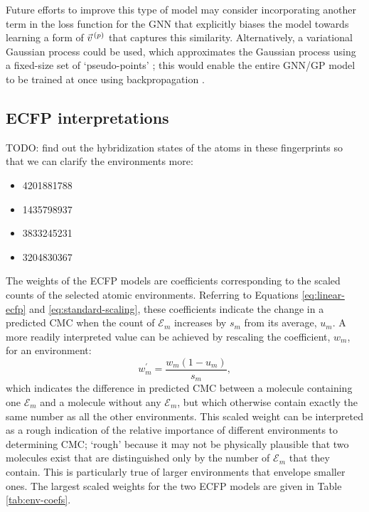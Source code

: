 Future efforts to improve this type of model may consider incorporating another term in the loss function for the GNN that explicitly biases the model towards learning a form of $\vec{v}^{\,(p)}{}$ that captures this similarity. Alternatively, a
variational Gaussian process could be used, which approximates the Gaussian process using a fixed-size set of `pseudo-points' \cite{hensmanGaussianProcessesBig2013a}; this would enable the entire GNN/GP model to be trained at once using backpropagation \cite{moriartyUnlockNNUncertaintyQuantification2022}.


\subsection{ECFP interpretations}

TODO: find out the hybridization states of the atoms in these fingerprints
so that we can clarify the environments more:
\begin{itemize}
    \item 4201881788
    \item 1435798937
    \item 3833245231
    \item 3204830367
\end{itemize}

The weights of the ECFP models are coefficients corresponding to the scaled counts of the selected atomic environments. Referring to Equations \ref{eq:linear-ecfp} and \ref{eq:standard-scaling}, these coefficients indicate
the change in a predicted CMC when the count of $\mathcal{E}_m$ increases by $s_m$ from its average, $u_m$. A more readily interpreted value can be achieved by rescaling the coefficient, $w_m$, for an environment:
\begin{equation}
    w_m^\prime = \frac{w_m(1 - u_m)}{s_m},
\end{equation}
which indicates the difference in predicted CMC between a molecule containing one $\mathcal{E}_m$ and a molecule without any $\mathcal{E}_m$, but which otherwise contain exactly the same number as all the other environments. This
scaled weight can be interpreted as a rough indication of the relative importance of different environments to determining CMC; `rough' because it may not be physically plausible that two molecules exist that are distinguished only
by the number of $\mathcal{E}_m$ that they contain. This is particularly true of larger environments that envelope smaller ones. The largest scaled weights for the two ECFP models are given in Table \ref{tab:env-coefs}.

